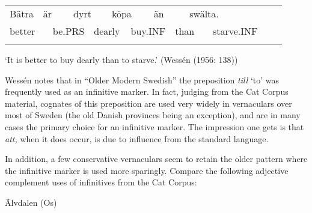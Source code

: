 \begin{tabular}{llllllllllllll}
\lsptoprule
Bätra & \multicolumn{2}{l}{är

} & \multicolumn{2}{l}{dyrt

} & \multicolumn{2}{l}{köpa

} & \multicolumn{2}{l}{än

} & \multicolumn{2}{l}{swälta.

} & \multicolumn{2}{l}{} & \\
\multicolumn{2}{l}{better

} & \multicolumn{2}{l}{be.PRS

} & \multicolumn{2}{l}{dearly

} & \multicolumn{2}{l}{buy.INF

} & \multicolumn{2}{l}{than

} & \multicolumn{2}{l}{starve.INF

} & \multicolumn{2}{l}{}\\
\lspbottomrule
\end{tabular}

\begin{styleTranslation}
‘It is better to buy dearly than to starve.’ (Wessén (1956: 138))

\end{styleTranslation}

\begin{styleBodyTextFirst}
Wessén notes that in “Older Modern Swedish” the preposition \textit{till} ‘to’ was frequently used as an infinitive marker. In fact, judging from the Cat Corpus material, cognates of this preposition are used very widely in vernaculars over most of Sweden (the old Danish provinces being an exception), and are in many cases the primary choice for an infinitive marker. The impression one gets is that \textit{att, }when it does occur, is due to influence from the standard language. 

\end{styleBodyTextFirst}

\begin{styleBodytextC}
In addition, a few conservative vernaculars seem to retain the older pattern where the infinitive marker is used more sparingly. Compare the following adjective complement uses of infinitives from the Cat Corpus:

\end{styleBodytextC}

\begin{listWWNumileveli}
\item 

\begin{styleExample}
Älvdalen (Os)

\end{styleExample}

\end{listWWNumileveli}

